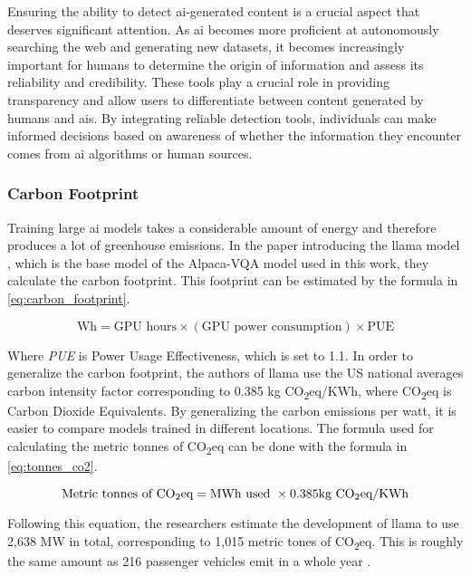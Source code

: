 Ensuring the ability to detect \gls{ai}-generated content is a crucial aspect that deserves significant attention. As \gls{ai} becomes more proficient at autonomously searching the web and generating new datasets, it becomes increasingly important for humans to determine the origin of information and assess its reliability and credibility. These tools play a crucial role in providing transparency and allow users to differentiate between content generated by humans and \glspl{ai}. By integrating reliable detection tools, individuals can make informed decisions based on awareness of whether the information they encounter comes from \gls{ai} algorithms or human sources.


\subsubsection{Carbon Footprint}
Training large \gls{ai} models takes a considerable amount of energy and therefore produces a lot of greenhouse emissions.  
In the paper introducing the \gls{llama} model \cite{touvronLLaMAOpenEfficient2023}, which is the base model of the Alpaca-VQA model used in this work, they calculate the carbon footprint. This footprint can be estimated by the formula in \autoref{eq:carbon_footprint}.

\begin{equation}
    \text{Wh} = \text{GPU hours} \times (\text{GPU power consumption}) \times \text{PUE}
    \label{eq:carbon_footprint}
\end{equation}

Where \textit{PUE} is Power Usage Effectiveness, which is set to 1.1.
In order to generalize the carbon footprint, the authors of \gls{llama} use the US national averages carbon intensity factor corresponding to 0.385 kg CO\textsubscript{2}eq/KWh, where CO\textsubscript{2}eq is Carbon Dioxide Equivalents. By generalizing the carbon emissions per watt, it is easier to compare models trained in different locations.
The formula used for calculating the metric tonnes of CO\textsubscript{2}eq can be done with the formula in \autoref{eq:tonnes_co2}.

\begin{equation}
    \text{Metric tonnes of CO\textsubscript{2}eq} = \text{MWh used } \times 0.385 \text{kg CO\textsubscript{2}eq/KWh}
    \label{eq:tonnes_co2}
\end{equation}

 
Following this equation, the researchers estimate the development of \gls{llama} to use 2,638 MW in total, corresponding to 1,015 metric tones of CO\textsubscript{2}eq.
This is roughly the same amount as 216 passenger vehicles emit in a whole year \cite{usepaGreenhouseGasEmissions2016}.

